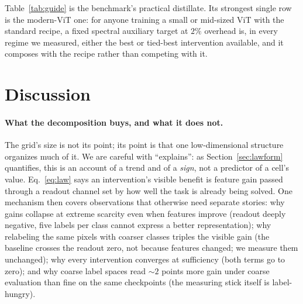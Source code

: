 Table~\ref{tab:guide} is the benchmark's practical distillate. Its
strongest single row is the modern-ViT one: for anyone training a small
or mid-sized ViT with the standard recipe, a fixed spectral auxiliary
target at $2\%$ overhead is, in every regime we measured, either the best
or tied-best intervention available, and it composes with the recipe
rather than competing with it.

\section{Discussion}\label{sec:discussion}

\paragraph{What the decomposition buys, and what it does not.}
 The grid's size is not its point; its point is that one low-dimensional
structure organizes much of it. We are careful with ``explains'': as
Section~\ref{sec:lawform} quantifies, this is an account of a trend and of a
\emph{sign}, not a predictor of a cell's value. Eq.~\ref{eq:law} says an intervention's
visible benefit is feature gain passed through a readout channel set by how
well the task is already being solved. One mechanism then covers observations
that otherwise need separate stories: why gains collapse at extreme
scarcity even when features improve (readout deeply negative, five
labels per class cannot express a better representation); why relabeling
the same pixels with coarser classes triples the visible gain (the
baseline crosses the readout zero, not because features changed; we
measure them unchanged); why every intervention converges at sufficiency
(both terms go to zero); and why coarse label spaces read ${\sim}2$ points more gain
under coarse evaluation than fine on the same checkpoints (the measuring
stick itself is label-hungry).

